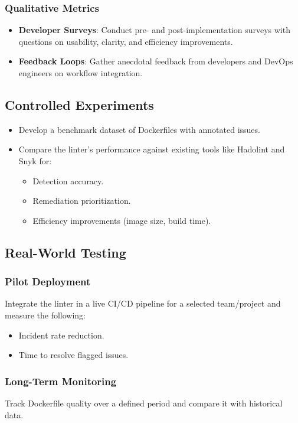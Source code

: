 \subsubsection{Qualitative Metrics}
\begin{itemize}
    \item \textbf{Developer Surveys}: Conduct pre- and post-implementation surveys with questions on usability, clarity, and efficiency improvements.
    \item \textbf{Feedback Loops}: Gather anecdotal feedback from developers and DevOps engineers on workflow integration.
\end{itemize}

\subsection{Controlled Experiments}
\begin{itemize}
    \item Develop a benchmark dataset of Dockerfiles with annotated issues.
    \item Compare the linter's performance against existing tools like Hadolint and Snyk for:
    \begin{itemize}
        \item Detection accuracy.
        \item Remediation prioritization.
        \item Efficiency improvements (image size, build time).
    \end{itemize}
\end{itemize}

\subsection{Real-World Testing}
\subsubsection{Pilot Deployment}
Integrate the linter in a live CI/CD pipeline for a selected team/project and measure the following:
\begin{itemize}
    \item Incident rate reduction.
    \item Time to resolve flagged issues.
\end{itemize}

\subsubsection{Long-Term Monitoring}
Track Dockerfile quality over a defined period and compare it with historical data.

